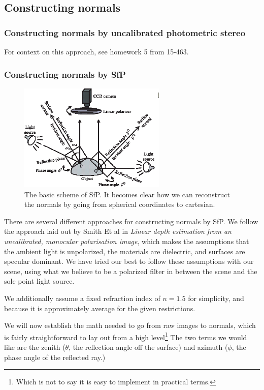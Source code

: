 \documentclass[final]{cvpr}
\begin{document}
\subsection{Constructing normals}
\subsubsection{Constructing normals by uncalibrated photometric stereo}
For context on this approach, see homework 5 from 15-463.
\subsubsection{Constructing normals by SfP}
\begin{figure}
	\centering
	\includegraphics[width=7cm]{sfp_diagram}	
	\caption{The basic scheme of SfP. It becomes clear how we can reconstruct the normals by going from spherical coordinates to cartesian.}
\end{figure}

	There are several different approaches for constructing normals by SfP. We follow the approach laid out by Smith Et al in \textit{Linear depth estimation from an uncalibrated, monocular polarisation image}, which makes the assumptions that the ambient light is unpolarized, the materials are dielectric, and surfaces are specular dominant. We have tried our best to follow these assumptions with our scene, using what we believe to be a polarized filter in between the scene and the sole point light source. 
	
	We additionally assume a fixed refraction index of $n=1.5$ for simplicity, and because it is approximately average for the given restrictions.
	
	
	We will now establish the math needed to go from raw images to normals, which is fairly straightforward to lay out from a high level\footnote{Which is not to say it is easy to implement in practical terms.} The two terms we would like are the zenith ($\theta$, the reflection angle off the surface) and azimuth ($\phi$, the phase angle of the reflected ray.) 
	
\end{document}
